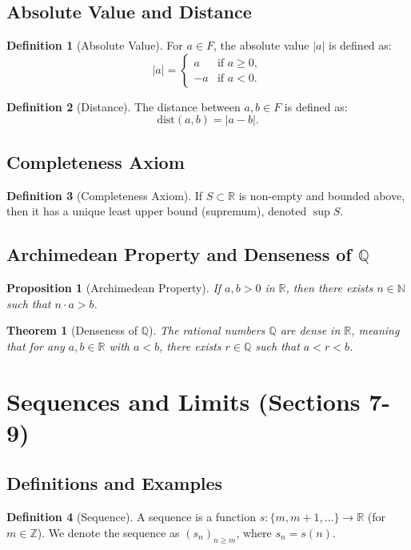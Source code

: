 \documentclass[9pt]{article}
\theoremstyle{definition}
\newtheorem{definition}{Definition}
\theoremstyle{plain}
\newtheorem{theorem}{Theorem}
\newtheorem{proposition}{Proposition}
\begin{document}
\subsection*{Absolute Value and Distance}
\begin{definition}[Absolute Value]
For \( a \in F \), the absolute value \( |a| \) is defined as:
\[
|a| =
\begin{cases}
a & \text{if } a \geq 0, \\
-a & \text{if } a < 0.
\end{cases}
\]
\end{definition}

\begin{definition}[Distance]
The distance between \( a, b \in F \) is defined as:
\[
\text{dist}(a, b) = |a - b|.
\]
\end{definition}

\subsection*{Completeness Axiom}
\begin{definition}[Completeness Axiom]
If \( S \subset \mathbb{R} \) is non-empty and bounded above, then it has a unique least upper bound (supremum), denoted \( \sup S \).
\end{definition}

\subsection*{Archimedean Property and Denseness of \( \mathbb{Q} \)}
\begin{proposition}[Archimedean Property]
If \( a, b > 0 \) in \( \mathbb{R} \), then there exists \( n \in \mathbb{N} \) such that \( n \cdot a > b \).
\end{proposition}

\begin{theorem}[Denseness of \( \mathbb{Q} \)]
The rational numbers \( \mathbb{Q} \) are dense in \( \mathbb{R} \), meaning that for any \( a, b \in \mathbb{R} \) with \( a < b \), there exists \( r \in \mathbb{Q} \) such that \( a < r < b \).
\end{theorem}
\section*{Sequences and Limits (Sections 7-9)}

\subsection*{Definitions and Examples}
\begin{definition}[Sequence]
A sequence is a function \( s : \{m, m + 1, \dots \} \to \mathbb{R} \) (for \( m \in \mathbb{Z} \)). We denote the sequence as \( (s_n)_{n \geq m} \), where \( s_n = s(n) \).
\end{definition}
\end{document}
